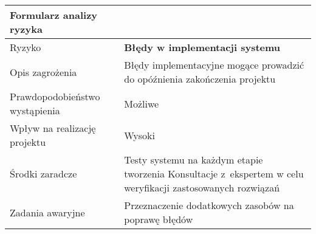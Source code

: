 \documentclass{article}
\begin{document}
{\def\arraystretch{1.3}\tabcolsep=10pt
\begin{tabular}{|L{6cm}|L{9cm}|}
\hline
Formularz analizy ryzyka &  \\
\hline
Ryzyko 						   & \textbf{Błędy w implementacji systemu} \\
\hline
Opis zagrożenia				   & Błędy implementacyjne mogące prowadzić do opóźnienia zakończenia projektu \\
\hline
Prawdopodobieństwo wystąpienia & Możliwe \\
\hline
Wpływ na realizację projektu   & Wysoki \\
\hline
Środki zaradcze				   & Testy systemu na każdym etapie tworzenia
Konsultacje z~ekspertem w celu weryfikacji zastosowanych rozwiązań
 \\
\hline
Zadania awaryjne			   & Przeznaczenie dodatkowych zasobów na poprawę błędów \\
\hline
\end{tabular}}
\end{document}
